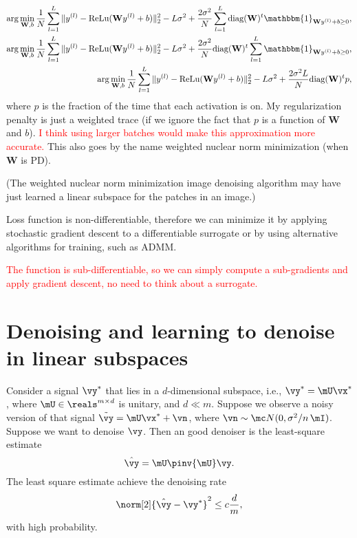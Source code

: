 \documentclass{article}
\begin{document}
\begin{align}
    \arg\min_{\mathbf{W},b} \frac{1}{N} \sum_{l=1}^{L}\|y^{(l)}-\text{ReLu}(\mathbf{W}y^{(l)}+b)\|_2^2-L\sigma^2+\frac{2\sigma^2}{N}\sum_{l=1}^L\text{diag}(\mathbf{W})^t\mathbbm{1}_{\mathbf{W}y^{(l)}+b\geq0},\nonumber \\
    \arg\min_{\mathbf{W},b} \frac{1}{N} \sum_{l=1}^{L}\|y^{(l)}-\text{ReLu}(\mathbf{W}y^{(l)}+b)\|_2^2-L\sigma^2+\frac{2\sigma^2}{N}\text{diag}(\mathbf{W})^t\sum_{l=1}^L\mathbbm{1}_{\mathbf{W}y^{(l)}+b\geq0}, \nonumber \\
    \arg\min_{\mathbf{W},b} \frac{1}{N} \sum_{l=1}^{L}\|y^{(l)}-\text{ReLu}(\mathbf{W}y^{(l)}+b)\|_2^2-L\sigma^2+\frac{2\sigma^2L}{N}\text{diag}(\mathbf{W})^tp,
\end{align}
where $p$ is the fraction of the time that each activation is on. My regularization penalty is just a weighted trace (if we ignore the fact that $p$ is a function of $\mathbf{W}$ and $b$). 
\textcolor{red}{I think using larger batches would make this approximation more accurate.}
This also goes by the name weighted nuclear norm minimization (when $\mathbf{W}$ is PD).

(The weighted nuclear norm minimization image denoising algorithm may have just learned a linear subspace for the patches in an image.)


Loss function is non-differentiable, therefore we can minimize it by applying stochastic gradient descent to a differentiable surrogate or by using alternative algorithms for training, such as ADMM.


\textcolor{red}{The function is sub-differentiable, so we can simply compute a sub-gradients and apply gradient descent, no need to think about a surrogate.}



\section{Denoising and learning to denoise in linear subspaces}

Consider a signal $\vy^\ast$ that lies in a $d$-dimensional subspace, i.e.,  $\vy^\ast = \mU \vx^\ast$, where $\mU \in \reals^{m\times d}$ is unitary, and $d \ll m$.
Suppose we observe a noisy version of that signal 
$\tilde \vy = \mU \vx^\ast + \vn$, where $\vn \sim \mc N(0, \sigma^2/n \, \mI)$. 
Suppose we want to denoise $\vy$. Then an good denoiser is the least-square estimate
\[
\hat \vy = \mU \pinv{\mU} \vy.
\]
The least square estimate achieve the denoising rate
\[
\norm[2]{ \hat \vy - \vy^\ast}^2 \leq c \frac{d}{m}, 
\]
with high probability. 
\end{document}
